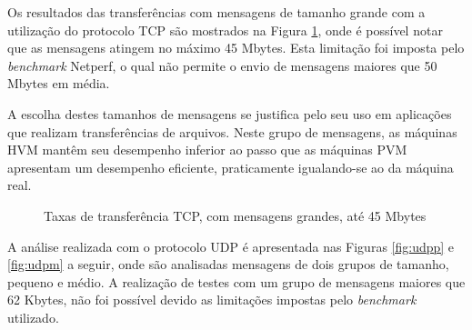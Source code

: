 \documentclass[times, 10pt,twocolumn]{article}
\begin{document}
Os resultados das transferências com mensagens de tamanho grande com a utilização do
protocolo TCP são mostrados na Figura \ref{fig:tcpg}, onde é possível notar 
que as mensagens atingem no máximo 45 Mbytes. Esta limitação foi imposta pelo 
\textit{benchmark} Netperf, o qual não permite o envio de mensagens maiores que 
50 Mbytes em média.

A escolha destes tamanhos de mensagens se justifica pelo seu uso em aplicações que 
realizam transferências de arquivos. Neste grupo de mensagens, as máquinas HVM 
mantêm seu desempenho inferior ao passo que as máquinas PVM apresentam um desempenho 
eficiente, praticamente igualando-se ao da máquina real.

\begin{figure}[!htb]
\centering
{}
\caption{Taxas de transferência TCP, com mensagens grandes, até 45 Mbytes}
\label{fig:tcpg}
\end{figure}

A análise realizada com o protocolo UDP é apresentada nas Figuras \ref{fig:udpp} e 
\ref{fig:udpm} a seguir, onde são analisadas mensagens de dois grupos de tamanho,
pequeno e médio. A realização de testes com um grupo de mensagens maiores que
62 Kbytes, não foi possível devido as limitações impostas pelo \textit{benchmark} 
utilizado.
\end{document}
